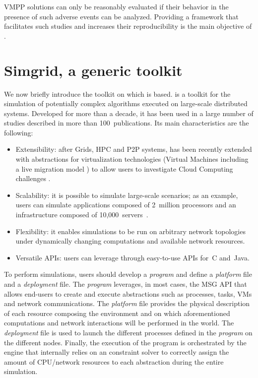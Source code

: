 VMPP solutions can only be reasonably evaluated if their behavior in
the presence of such adverse events can be analyzed. Providing a
framework that facilitates such studies and increases their
reproducibility is the main objective of \vmps.

\section{Simgrid, a generic toolkit}
\label{sec:sg}

We now briefly introduce the toolkit on which \vmps is based.  \sg is
a toolkit for the simulation of potentially complex algorithms
executed on large-scale distributed systems.  Developed for more than
a decade, it has been used in a large number of studies described in
more than 100~publications.  Its main characteristics are the
following:
\begin{itemize}
  \item Extensibility: after Grids, HPC and P2P systems, \sg has been
    recently extended with abstractions for virtualization
    technologies (\ie Virtual Machines including a live migration
    model \cite{Hirofuchi:2013:ALM:2568486.2568524}) to allow users to
    investigate Cloud Computing challenges \cite{lucas:cloud2014}.
  \item Scalability: it is possible to simulate large-scale scenarios;
    as an example, users can simulate applications composed of
    2~million processors and an infrastructure composed of
    10,000~servers~\cite{casanova:hal-01017319}.
  \item Flexibility: it enables simulations to be run on arbitrary
    network topologies under dynamically changing computations and
    available network resources.
  \item Versatile APIs: users can leverage \sg through easy-to-use
    APIs for~C and~Java.
\end{itemize}

To perform simulations, users should develop a \emph{program} and
define a \emph{platform} file and a \emph{deployment} file. The
\emph{program} leverages, in most cases, the \sg MSG API that allows
end-users to create and execute \sg abstractions such as processes,
tasks, VMs and network communications. The \emph{platform} file
provides the physical description of each resource composing the
environment and on which aforementioned computations and network
interactions will be performed in the \sg world.
The \emph{deployment} file is used to launch the different \sg
processes defined in the \emph{program} on the different nodes.
Finally, the execution of the program is orchestrated by the \sg
engine that internally relies on an constraint solver to correctly
assign the amount of CPU/network resources to each \sg abstraction
during the entire simulation.

